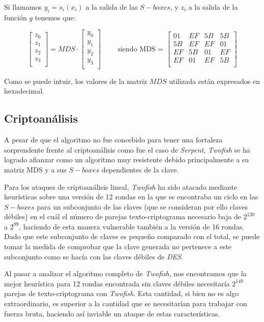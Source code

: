 Si llamamos $y_i = s_i (x_i)$ a la salida de las $S-boxes$, y $z_i$ a la salida de la función $g$ tenemos que:

$$\begin{bmatrix}
z_0 \\
z_1 \\
z_2 \\
z_3 \\
\end{bmatrix} =
MDS \cdot
\begin{bmatrix}
y_0 \\
y_1 \\
y_2 \\
y_3 \\
\end{bmatrix} \qquad \text{ siendo MDS = }
\begin{bmatrix}
01 & EF & 5B & 5B \\
5B & EF & EF & 01 \\
EF & 5B & 01 & EF \\
EF & 01 & EF & 5B \\
\end{bmatrix}$$

Como se puede intuir, los valores de la matriz $MDS$ utilizada están expresados en hexadecimal.

\subsection{Criptoanálisis}
A pesar de que el algoritmo no fue concebido para tener una fortaleza sorprendente frente al criptoanálisis como fue el caso de \textit{Serpent}, \textit{Twofish} se ha logrado afianzar como un algoritmo muy resistente debido principalmente a su matriz MDS y a sus $S-boxes$ dependientes de la clave.

Para los ataques de criptoanálisis lineal, \textit{Twofish} ha sido atacado mediante heurísticas sobre una versión de 12 rondas en la que se encontraba un ciclo en las $S-boxes$ para un subconjunto de las claves (que se consideran por ello claves débiles) en el cuál el número de parejas texto-criptograma necesario baja de $2^120$ a $2^89$, haciendo de esta manera vulnerable también a la versión de 16 rondas. Dado que este subconjunto de claves es pequeño comparado con el total, se puede tomar la medida de comprobar que la clave generada no pertenece a este subconjunto como se hacía con las claves débiles de \textit{DES}.

Al pasar a analizar el algoritmo completo de \textit{Twofish}, nos encontramos que la mejor heurística para 12 rondas encontrada sin claves débiles necesitaría $2^149$ parejas de texto-criptograma con \textit{Twofish}. Esta cantidad, si bien no es algo extraordinario, es superior a la cantidad que se necesitarían para trabajar con fuerza bruta, haciendo así inviable un ataque de estas características.

